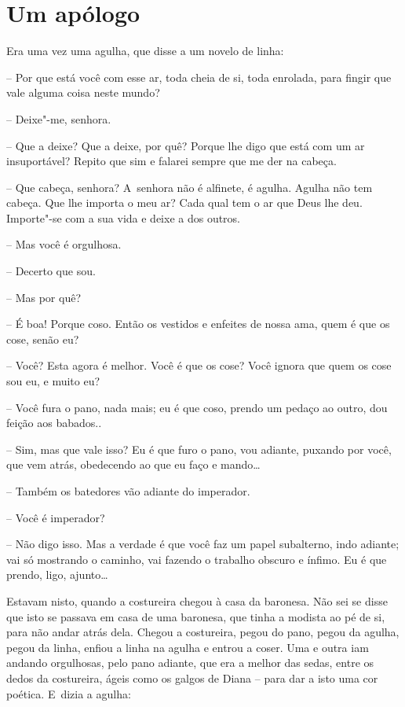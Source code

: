 \chapter{Um apólogo}

Era uma vez uma agulha, que disse a um novelo de linha:

-- Por que está você com esse ar, toda cheia de si, toda enrolada, para
fingir que vale alguma coisa neste mundo?

-- Deixe"-me, senhora.

-- Que a deixe? Que a deixe, por quê? Porque lhe digo que está com um ar
insuportável? Repito que sim e falarei sempre que me der na cabeça.

-- Que cabeça, senhora? A~senhora não é alfinete, é agulha. Agulha não
tem cabeça. Que lhe importa o meu ar? Cada qual tem o ar que Deus lhe
deu. Importe"-se com a sua vida e deixe a dos outros.

-- Mas você é orgulhosa.

-- Decerto que sou.

-- Mas por quê?

-- É boa! Porque coso. Então os vestidos e enfeites de nossa ama, quem é
que os cose, senão eu?

-- Você? Esta agora é melhor. Você é que os cose? Você ignora que quem
os cose sou eu, e muito eu?

-- Você fura o pano, nada mais; eu é que coso, prendo um pedaço ao
outro, dou feição aos babados..

-- Sim, mas que vale isso? Eu é que furo o pano, vou adiante, puxando
por você, que vem atrás, obedecendo ao que eu faço e mando\ldots{}

-- Também os batedores vão adiante do imperador.

-- Você é imperador?

-- Não digo isso. Mas a verdade é que você faz um papel subalterno, indo
adiante; vai só mostrando o caminho, vai fazendo o trabalho obscuro e
ínfimo. Eu é que prendo, ligo, ajunto\ldots{}

Estavam nisto, quando a costureira chegou à casa da baronesa. Não sei se
disse que isto se passava em casa de uma baronesa, que tinha a modista
ao pé de si, para não andar atrás dela. Chegou a costureira, pegou do
pano, pegou da agulha, pegou da linha, enfiou a linha na agulha e entrou
a coser. Uma e outra iam andando orgulhosas, pelo pano adiante, que era
a melhor das sedas, entre os dedos da costureira, ágeis como os galgos
de Diana -- para dar a isto uma cor poética. E~dizia a agulha:

